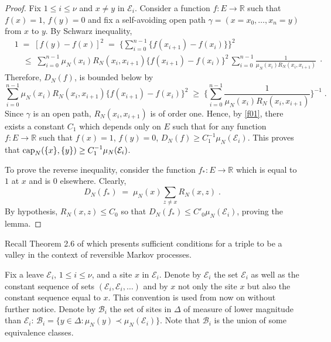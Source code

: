 \documentclass[reqno]{amsart}
\begin{document}
\begin{proof}
Fix $1\le i\le \nu$ and $x\not = y$ in ${{\mathcal E}}_i$.  Consider a function
$f:E\to {{\mathbb R}}$ such that $f(x)=1$, $f(y)=0$ and fix a self-avoiding
open path $\gamma =(x=x_0, \dots, x_n=y)$ from $x$ to $y$. By Schwarz
inequality,
\begin{equation*}
\begin{split}
& 1 \;=\; [f(y) - f(x)]^2 \;=\; \Big\{ \sum_{i=0}^{n-1}
\{f(x_{i+1})-f(x_i)\} \Big\}^2 \\
& \quad \le\; 
\sum_{i=0}^{n-1} \mu_N(x_i) R_N(x_i, x_{i+1}) \{f(x_{i+1})-f(x_i)\}^2 
\, \sum_{i=0}^{n-1} \frac 1{\mu_N(x_i) R_N(x_i, x_{i+1})}\; \cdot
\end{split}
\end{equation*}
Therefore, $D_N(f)$, is bounded below by 
\begin{equation*}
\sum_{i=0}^{n-1} \mu_N(x_i) R_N(x_i, x_{i+1})
\{f(x_{i+1})-f(x_i)\}^2 \;\ge\; \Big\{ \sum_{i=0}^{n-1} 
\frac 1{\mu_N(x_i) R_N(x_i, x_{i+1})} \Big\}^{-1}\;.
\end{equation*}
Since $\gamma$ is an open path, $R_N(x_i,x_{i+1})$ is of order
one. Hence, by \eqref{f01}, there exists a constant $C_1$ which
depends only on $E$ such that for any function $f:E\to {{\mathbb R}}$ such
that $f(x)=1$, $f(y)=0$, $D_N(f) \ge C^{-1}_1 \mu_N({{\mathcal E}}_i)$.  This
proves that ${{\rm cap}}_N(\{x\}, \{y\})\ge C^{-1}_1 \mu_N({{\mathcal E}}_i)$.

To prove the reverse inequality, consider the function $f_*:E\to {{\mathbb R}}$ which is equal to $1$ at $x$ and is $0$ elsewhere. Clearly,
\begin{equation*}
D_N(f_*) \;=\;  \mu_N(x) \sum_{z\not =x} R_N(x,z)\;.  
\end{equation*}
By hypothesis, $R_N(x,z) \le C_0$ so that $D_N(f_*) \le C'_0 \mu_N({{\mathcal E}}_i)$, proving the lemma.
\end{proof}

Recall Theorem 2.6 of \cite{bl2} which presents sufficient conditions
for a triple to be a valley in the context of reversible Markov
processes.

Fix a leave ${{\mathcal E}}_i$, $1\le i\le \nu$, and a site $x$ in ${{\mathcal E}}_i$.
Denote by ${{\mathcal E}}_i$ the set ${{\mathcal E}}_i$ as well as the constant sequence
of sets $({{\mathcal E}}_i, {{\mathcal E}}_i , \dots)$ and by $x$ not only the site $x$
but also the constant sequence equal to $x$. This convention is used
from now on without further notice. Denote by ${{\mathcal B}}_i$ the set of
sites in $\Delta$ of measure of lower magnitude than ${{\mathcal E}}_i$: ${{\mathcal B}}_i = \{y\in \Delta : \mu_N(y) \prec \mu_N({{\mathcal E}}_i)\}$. Note that ${{\mathcal B}}_i$ is the union of some equivalence classes.
\end{document}
